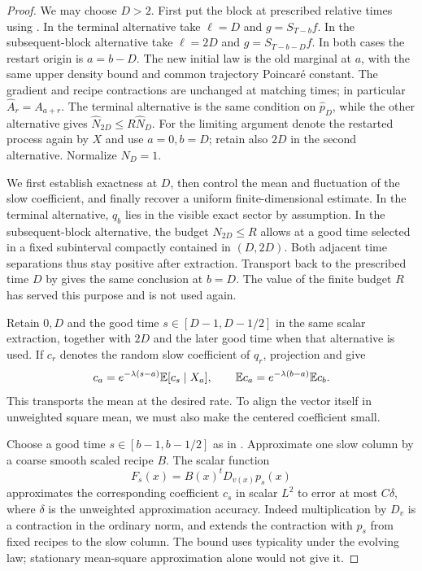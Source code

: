 \begin{proof}
We may choose $D>2$.  First put the block at prescribed relative times
using .  In the terminal alternative take $\ell=D$
and $g=S_{T-b}f$.  In the subsequent-block alternative take $\ell=2D$
and $g=S_{T-b-D}f$.  In both cases the restart origin is $a=b-D$.
The new initial law is the old marginal at $a$, with the same upper
density bound and common trajectory Poincar\'e constant.  The gradient
and recipe contractions are unchanged at matching times; in particular
$\widehat A_r=A_{a+r}$.  The terminal alternative is the same
condition on $\widehat p_D$, while the other alternative gives
$\widehat N_{2D}\le R\widehat N_D$.
For the limiting argument denote the restarted process again by $X$
and use $a=0,b=D$; retain also $2D$ in the second alternative.
Normalize $N_D=1$.

We first establish exactness at $D$, then control the mean and
fluctuation of the slow coefficient, and finally recover a uniform
finite-dimensional estimate.  In the terminal alternative,
$q_b$ lies in the visible exact sector by assumption.  In the
subsequent-block alternative, the budget $N_{2D}\le R$ allows
 at a good time selected in a fixed
subinterval compactly contained in $(D,2D)$.  Both adjacent time
separations thus stay positive after extraction.  Transport back to the prescribed time $D$ by
 gives the same conclusion at $b=D$.  The value of the finite budget $R$ has served
this purpose and is not used again.

Retain $0,D$ and the good time $s\in[D-1,D-1/2]$ in the same
scalar extraction, together with $2D$ and the later good time when
that alternative is used.  If $c_r$ denotes the random slow coefficient of
$q_r$, projection and  give
\begin{equation}
 c_a=e^{-\lambda(s-a)}\mathbb E[c_s\mid X_a],\qquad
 \mathbb E c_a=e^{-\lambda(b-a)}\mathbb E c_b.
 \label{eq:cutoff-slow-transport}
\end{equation}
This transports the mean at the desired rate.  To align the vector
itself in unweighted square mean, we must also make the centered
coefficient small.

Choose a good time $s\in[b-1,b-1/2]$ as in
.  Approximate one slow column by a coarse
smooth scaled recipe $B$.  The scalar function
\[
 F_s(x)=B(x)^tD_{v(x)}p_s(x)
\]
approximates the corresponding coefficient $c_s$ in scalar $L^2$
to error at most $C\delta$, where $\delta$ is the unweighted
approximation accuracy.  Indeed multiplication by $D_v$ is a contraction
in the ordinary norm, and  extends
the contraction with $p_s$ from fixed recipes to the slow column.
The bound uses typicality under the evolving law; stationary
mean-square approximation alone would not give it.


\end{proof}
